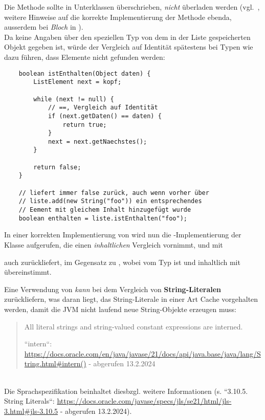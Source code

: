 Die Methode  sollte in Unterklassen überschrieben, \textit{nicht} überladen werden (vgl.~\cite[654]{Ull23}, weitere Hinweise auf die korrekte Implementierung der Methode ebenda, ausserdem bei \textit{Bloch} in \cite[37]{Blo18}).\\

\noindent
Da keine Angaben über den speziellen Typ von dem in der Liste gespeicherten Objekt gegeben ist, würde der Vergleich auf Identität spätestens bei Typen wie  dazu führen, dass Elemente nicht gefunden werden:

\begin{verbatim}
    boolean istEnthalten(Object daten) {
        ListElement next = kopf;

        while (next != null) {
            // ==, Vergleich auf Identität
            if (next.getDaten() == daten) {
                return true;
            }
            next = next.getNaechstes();
        }

        return false;
    }

    // liefert immer false zurück, auch wenn vorher über
    // liste.add(new String("foo")) ein entsprechendes
    // Eement mit gleichem Inhalt hinzugefügt wurde
    boolean enthalten = liste.istEnthalten("foo");
\end{verbatim}

In einer korrekten Implementierung von  wird nun die -Implementierung der Klasse  aufgerufen, die einen \textit{inhaltlichen} Vergleich vornimmt, und mit \begin{center}\end{center} auch  zurückliefert, im Gegensatz zu , wobei  vom Typ  ist und inhaltlich mit  übereinstimmt.\\

\begin{tcolorbox}[title=String-Literale]
Eine Verwendung von \code{==} \textit{kann} bei dem Vergleich von \textbf{String-Literalen}  zurückliefern, was daran liegt, das String-Literale in einer Art Cache vorgehalten werden, damit die JVM nicht laufend neue String-Objekte erzeugen muss:\\

\blockquote[{``intern``: \url{https://docs.oracle.com/en/java/javase/21/docs/api/java.base/java/lang/String.html#intern()} - abgerufen 13.2.2024}]{
    All literal strings and string-valued constant expressions are interned.
 }\\

\noindent
Die Sprachspezifikation beinhaltet diesbzgl. weitere Informationen (s. ``3.10.5. String Literals``: \url{https://docs.oracle.com/javase/specs/jls/se21/html/jls-3.html#jls-3.10.5} - abgerufen 13.2.2024).
\end{tcolorbox}